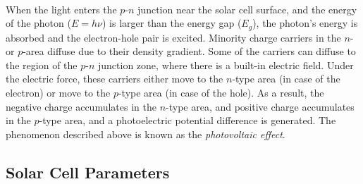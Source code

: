 \documentclass[a4paper]{article}
\begin{document}
    \paragraph{} When the light enters the $p$-$n$ junction near the solar cell surface, and the energy of the photon ($E=h\nu$) is larger than the energy gap ($E_g$), the photon's energy is absorbed and the electron-hole pair is excited. Minority charge carriers in the $n$- or $p$-area diffuse due to their density gradient. Some of the carriers can diffuse to the region of the $p$-$n$ junction zone, where there is a built-in electric field. Under the electric force, these carriers either move to the $n$-type area (in case of the electron) or move to the $p$-type area (in case of the hole). As a result, the negative charge accumulates in the $n$-type area, and positive charge accumulates in the $p$-type area, and a photoelectric potential difference is generated. The phenomenon described above is known as the \emph{photovoltaic effect}.
    \subsection{Solar Cell Parameters}
\end{document}
